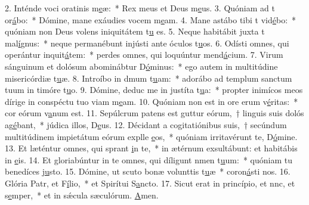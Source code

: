 2. Inténde voci oratinis m\uline{e}æ:~* Rex meus et Deus m\uline{e}us.
3. Quóniam ad t or\uline{á}bo:~* Dómine, mane exáudies vocem m\uline{e}am.
4. Mane astábo tibi t vid\uline{é}bo:~* quóniam non Deus volens iniquitátem t\uline{u} es.
5. Neque habitábit juxta t mal\uline{í}gnus:~* neque permanébunt injústi ante óculos t\uline{u}os.
6. Odísti omnes, qui operántur inquit\uline{á}tem:~* perdes omnes, qui loquúntur mend\uline{á}cium.
7. Virum sánguinum et dolósum abominábtur D\uline{ó}minus:~* ego autem in multitúdine misericórdiæ t\uline{u}æ.
8. Introíbo in dmum t\uline{u}am:~* adorábo ad templum sanctum tuum in timóre t\uline{u}o.
9. Dómine, deduc me in justíta t\uline{u}a:~* propter inimícos meos dírige in conspéctu tuo viam m\uline{e}am.
10. Quóniam non est in ore erum v\uline{é}ritas:~* cor eórum v\uline{a}num est.
11. Sepúlcrum patens est guttur eórum,~† linguis suis dolós ag\uline{é}bant,~* júdica illos, D\uline{e}us.
12. Décidant a cogitatiónibus suis,~† secúndum multitúdinem impietátum eórum explle \uline{e}os,~* quóniam irritavérunt te, D\uline{ó}mine.
13. Et læténtur omnes, qui sprant \uline{i}n te,~* in ætérnum exsultábunt: et habitábis in \uline{e}is.
14. Et gloriabúntur in te omnes, qui díligunt nmen t\uline{u}um:~* quóniam tu benedíces j\uline{u}sto.
15. Dómine, ut scuto bonæ volunttis t\uline{u}æ~* coron\uline{á}sti nos.
16. Glória Patr, et F\uline{í}lio,~* et Spirítui S\uline{a}ncto.
17. Sicut erat in princípio, et nnc, et s\uline{e}mper,~* et in sǽcula sæculórum. \uline{A}men.

